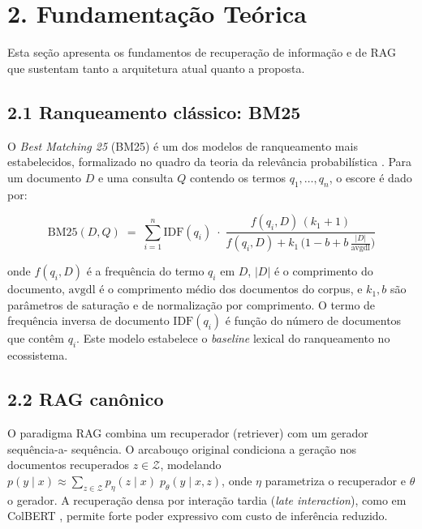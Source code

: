 \documentclass[
	article,
	11pt,
	oneside,
	a4paper,
	english,
	brazil,
	sumario=tradicional
	]{abntex2}
\begin{document}
\section*{2. Fundamentação Teórica}

Esta seção apresenta os fundamentos de recuperação de informação e de RAG que
sustentam tanto a arquitetura atual quanto a proposta.

\subsection*{2.1 Ranqueamento clássico: BM25}

O \emph{Best Matching 25} (BM25) é um dos modelos de ranqueamento mais
estabelecidos, formalizado no quadro da teoria da relevância probabilística
\cite{RobertsonZaragoza2009BM25}. Para um documento $D$ e uma consulta $Q$
contendo os termos $q_1,\dots,q_n$, o escore é dado por:

\begin{equation}
\label{eq:bm25}
\text{BM25}(D,Q)\;=\;\sum_{i=1}^{n}
\text{IDF}(q_i)\;\cdot\;
\frac{f(q_i,D)\,(k_1+1)}{f(q_i,D)+k_1\,\bigl(1-b+b\,\tfrac{|D|}{\text{avgdl}}\bigr)}
\end{equation}

onde $f(q_i,D)$ é a frequência do termo $q_i$ em $D$, $|D|$ é o comprimento do
documento, $\text{avgdl}$ é o comprimento médio dos documentos do corpus, e
$k_1,b$ são parâmetros de saturação e de normalização por comprimento. O termo de
frequência inversa de documento $\text{IDF}(q_i)$ é função do número de documentos
que contêm $q_i$. Este modelo estabelece o \emph{baseline} lexical do
ranqueamento no ecossistema.

\subsection*{2.2 RAG canônico}

O paradigma RAG combina um recuperador (retriever) com um gerador sequência-a-
sequência. O arcabouço original \cite{Lewis2020RAG} condiciona a geração nos
documentos recuperados $z \in \mathcal{Z}$, modelando
$p(y \mid x) \approx \sum_{z \in \mathcal{Z}} p_\eta(z \mid x)\; p_\theta(y \mid x, z)$,
onde $\eta$ parametriza o recuperador e $\theta$ o gerador. A recuperação densa
por interação tardia (\emph{late interaction}), como em ColBERT
\cite{KhattabZaharia2020ColBERT}, permite forte poder expressivo com custo de
inferência reduzido.
\end{document}
